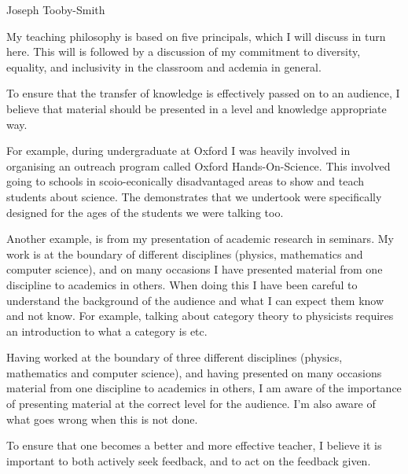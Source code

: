 \documentclass[12pt,letter]{article}
\newcounter{customtitle}
\begin{document}
\vspace{-1cm}
\begin{flushright}
{{\Large \color{white}Joseph Tooby-Smith}}
\end{flushright}
\vspace{0.4cm}

My teaching philosophy is based on five principals, which I will discuss in turn here. This will is followed by a discussion of my commitment to diversity, equality, and inclusivity in the classroom and acdemia in general.
 
 
 To ensure that the transfer of knowledge is effectively passed on to an audience, I believe that material should be presented in a level and knowledge appropriate way. 
 
 For example, during undergraduate at Oxford I was heavily involved in organising an outreach program called Oxford Hands-On-Science. This involved going to schools in scoio-econically disadvantaged areas to show and teach students about science. The demonstrates that we undertook were specifically designed for the ages of the students we were talking too. 
 
 Another example, is from my presentation of academic research in seminars. My work is at the boundary of different disciplines (physics, mathematics and computer science), and on many occasions I have presented material from one  discipline to academics in others. When doing this I have been careful to understand the background of the audience and what I can expect them know and not know. For example, talking about category theory to physicists requires an introduction to what a category is etc.
 
 
  Having worked at the boundary of 
three different disciplines (physics, mathematics and computer science), and having 
presented on many occasions material from one  discipline to academics in others, 
I am aware of the importance of presenting material at the correct level for the audience.
I'm also aware of what goes wrong when this is not done. 


 To ensure that one becomes a better and more effective teacher, I believe it is important to both actively seek feedback, and to act on the feedback given. 
 
\end{document}
